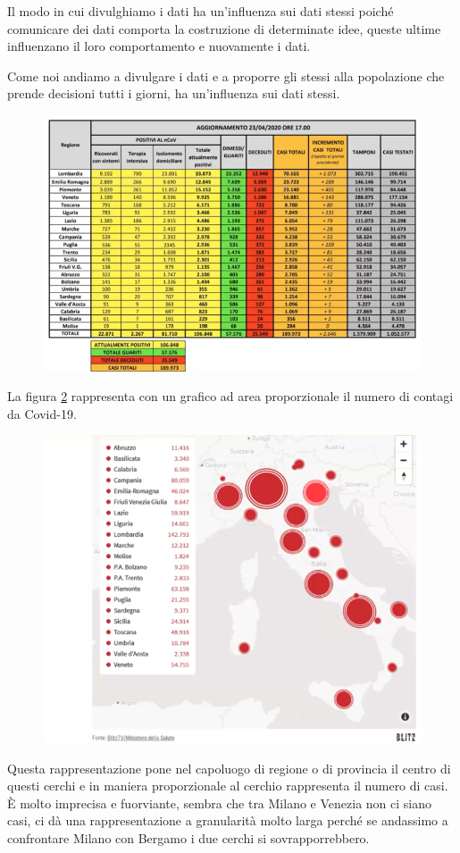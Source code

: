 \documentclass[12pt,a4paper]{report}
\begin{document}
Il modo in cui divulghiamo i dati ha un'influenza sui dati stessi poiché comunicare dei dati comporta la costruzione di determinate idee, queste ultime influenzano il loro comportamento e nuovamente i dati.

Come noi andiamo a divulgare i dati e a proporre  gli stessi alla popolazione che prende decisioni tutti i giorni, ha un'influenza sui dati stessi. 
\begin{figure}[h]
	\centering
	\includegraphics[width=0.6\linewidth]{imgs datavis/Tabella contagi covid-19.png}
	\caption{}
	\label{fig:contagi}
\end{figure} 

\newpage

La figura \ref{fig:contagi1} rappresenta con un grafico ad area proporzionale il numero di contagi da Covid-19. 

\begin{figure}[h]
	\centering
	\includegraphics[width=0.6\linewidth]{imgs datavis/Contagi regioni.png}
	\caption{}
	\label{fig:contagi1}
\end{figure} 

Questa rappresentazione pone nel capoluogo di regione o di provincia il centro di questi cerchi e in maniera proporzionale al cerchio rappresenta il numero di casi. \`E molto imprecisa e fuorviante, sembra che tra Milano e Venezia non ci siano casi, ci dà una rappresentazione a granularità molto larga perché se andassimo a confrontare Milano con Bergamo i due cerchi si sovrapporrebbero. 
\end{document}

